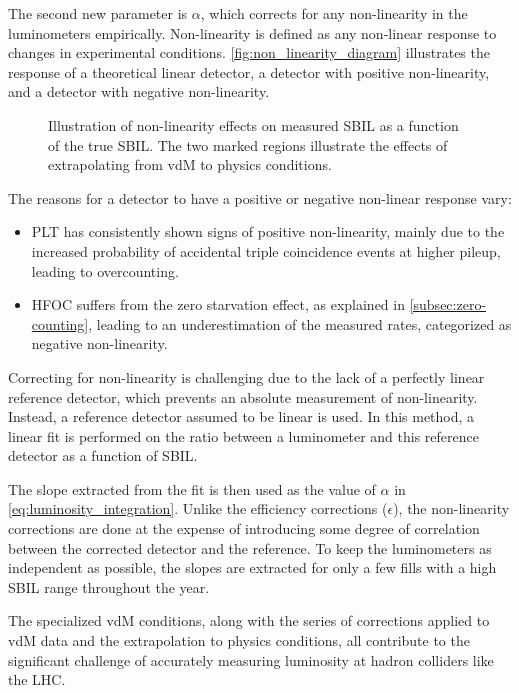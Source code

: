 The second new parameter is \(\alpha\), which corrects for any non-linearity in the luminometers empirically. Non-linearity is defined as any non-linear response to changes in experimental conditions. \autoref{fig:non_linearity_diagram} illustrates the response of a theoretical linear detector, a detector with positive non-linearity, and a detector with negative non-linearity.

\begin{figure}[!htb]
    \centering
    \caption[Non-linearity effects on SBIL]{Illustration of non-linearity effects on measured SBIL as a function of the true SBIL. The two marked regions illustrate the effects of extrapolating from vdM to physics conditions.}
    \label{fig:non_linearity_diagram}
\end{figure}

The reasons for a detector to have a positive or negative non-linear response vary:

\begin{itemize}
    \item PLT has consistently shown signs of positive non-linearity, mainly due to the increased probability of accidental triple coincidence events at higher pileup, leading to overcounting.
    \item HFOC suffers from the zero starvation effect, as explained in \autoref{subsec:zero-counting}, leading to an underestimation of the measured rates, categorized as negative non-linearity.
\end{itemize}

Correcting for non-linearity is challenging due to the lack of a perfectly linear reference detector, which prevents an absolute measurement of non-linearity. Instead, a reference detector assumed to be linear is used. In this method, a linear fit is performed on the ratio between a luminometer and this reference detector as a function of SBIL. 

The slope extracted from the fit is then used as the value of \(\alpha\) in \autoref{eq:luminosity_integration}. Unlike the efficiency corrections (\(\epsilon\)), the non-linearity corrections are done at the expense of introducing some degree of correlation between the corrected detector and the reference. To keep the luminometers as independent as possible, the slopes are extracted for only a few fills with a high SBIL range throughout the year.

The specialized vdM conditions, along with the series of corrections applied to vdM data and the extrapolation to physics conditions, all contribute to the significant challenge of accurately measuring luminosity at hadron colliders like the LHC.

